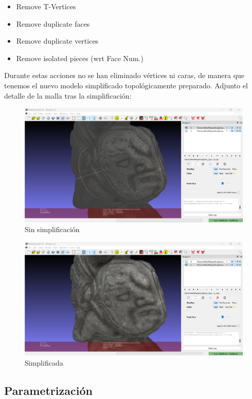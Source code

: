 \documentclass[options]{article}
\begin{document}
\begin{itemize}
    \item Remove T-Vertices
    \item Remove duplicate faces
    \item Remove duplicate vertices
    \item Remove isolated pieces (wrt Face Num.)
\end{itemize}

Durante estas acciones no se han eliminado vértices ni caras, de manera que tenemos el nuevo modelo simplificado topológicamente preparado.
Adjunto el detalle de la malla tras la simplificación:

\begin{figure}[H]
    \centering
    \includegraphics[scale=0.34]{images/simplificacion_04.png}
    \caption{Sin simplificación}
\end{figure}

\begin{figure}[H]
    \centering
    \includegraphics[scale=0.34]{images/simplificacion_05.png}
    \caption{Simplificada}
\end{figure}

\subsection{Parametrización}
\end{document}
